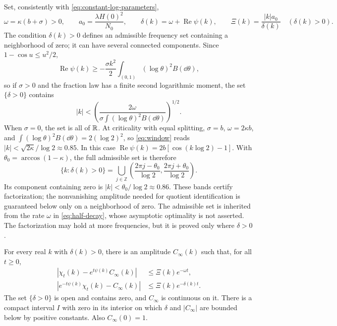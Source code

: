Set, consistently with \eqref{eq:constant-log-parameters},
\begin{equation}
 \omega=\kappa(b+\sigma)>0,\qquad
 a_0=\frac{\lambda H(0)^2}{N_0},\qquad
 \delta(k)=\omega+\operatorname{Re}\psi(k),\qquad
 \Xi(k)=\frac{|k|a_0}{\delta(k)}\quad(\delta(k)>0).
 \label{eq:fourier-constants}
\end{equation}
The condition $\delta(k)>0$ defines an admissible frequency set containing
a neighborhood of zero; it can have several connected components.
Since $1-\cos u\leq u^2/2$,
\begin{equation}
 \operatorname{Re}\psi(k)
 \geq-\frac{\sigma k^2}2\int_{(0,1)}(\log\theta)^2B(\dd\theta),
 \label{eq:window-quadratic}
\end{equation}
so if $\sigma>0$ and the fraction law has a finite second logarithmic
moment, the set $\{\delta>0\}$ contains
\begin{equation}
 |k|<\left(\frac{2\omega}{\sigma\int(\log\theta)^2B(\dd\theta)}\right)^{1/2}.
 \label{eq:window}
\end{equation}
When $\sigma=0$, the set is all of $\mathbb R$. At criticality with equal
splitting, $\sigma=b$, $\omega=2\kappa b$, and
$\int(\log\theta)^2B(\dd\theta)=2(\log2)^2$, so \eqref{eq:window} reads
$|k|<\sqrt{2\kappa}/\log2\approx0.85$. In this case
$\operatorname{Re}\psi(k)=2b[\cos(k\log2)-1]$. With
$\theta_0=\arccos(1-\kappa)$, the full admissible set is therefore
\[
 \{k:\delta(k)>0\}
 =\bigcup_{j\in\mathbb Z}
 \left(\frac{2\pi j-\theta_0}{\log2},
       \frac{2\pi j+\theta_0}{\log2}\right).
\]
Its component containing zero is $|k|<\theta_0/\log2\approx0.86$.
These bands certify factorization; the nonvanishing amplitude needed for
quotient identification is guaranteed below only on a neighborhood of zero.
The admissible set is inherited from the rate $\omega$ in
\eqref{eq:half-decay}, whose asymptotic optimality is not asserted.
The factorization may hold at more frequencies, but it is proved only
where $\delta>0$.

\begin{theorem}\label{thm:factorization}
For every real $k$ with $\delta(k)>0$, there is an amplitude
$C_\infty(k)$ such that, for all $t\geq0$,
\begin{align}
 |\chi_t(k)-e^{t\psi(k)}C_\infty(k)|
 &\leq \Xi(k)e^{-\omega t},\label{eq:factorization}\\
 |e^{-t\psi(k)}\chi_t(k)-C_\infty(k)|
 &\leq \Xi(k)e^{-\delta(k)t}.\label{eq:amplitude-error}
\end{align}
The set $\{\delta>0\}$ is open and contains zero, and $C_\infty$ is
continuous on it. There is a compact interval $I$ with zero in its
interior on which $\delta$ and $|C_\infty|$ are bounded below by positive
constants. Also $C_\infty(0)=1$.
\end{theorem}

